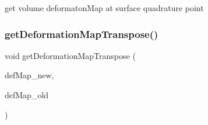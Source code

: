 get volume deformaton\+Map at surface quadrature point \mbox{\label{group___evaluation_functions_gad4003712a2346a79e13bdbfcad4d1e1c}} 
\subsubsection{\texorpdfstring{getDeformationMapTranspose()}{getDeformationMapTranspose()}}
{\footnotesize\ttfamily void get\+Deformation\+Map\+Transpose (\begin{DoxyParamCaption}\item[{\mbox{\hyperlink{structdeformation_map}{deformation\+Map}}$<$ T, dim $>$ \&}]{def\+Map\+\_\+new,  }\item[{\mbox{\hyperlink{structdeformation_map}{deformation\+Map}}$<$ T, dim $>$ \&}]{def\+Map\+\_\+old }\end{DoxyParamCaption})}

